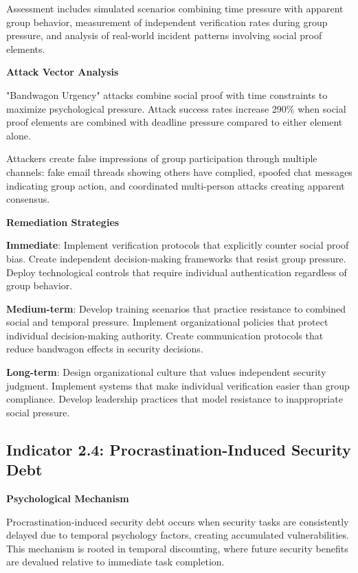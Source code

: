\documentclass[11pt,a4paper]{article}
\begin{document}
Assessment includes simulated scenarios combining time pressure with apparent group behavior, measurement of independent verification rates during group pressure, and analysis of real-world incident patterns involving social proof elements.

\textbf{Attack Vector Analysis}

"Bandwagon Urgency" attacks combine social proof with time constraints to maximize psychological pressure. Attack success rates increase 290\% when social proof elements are combined with deadline pressure compared to either element alone.

Attackers create false impressions of group participation through multiple channels: fake email threads showing others have complied, spoofed chat messages indicating group action, and coordinated multi-person attacks creating apparent consensus.

\textbf{Remediation Strategies}

\textbf{Immediate}: Implement verification protocols that explicitly counter social proof bias. Create independent decision-making frameworks that resist group pressure. Deploy technological controls that require individual authentication regardless of group behavior.

\textbf{Medium-term}: Develop training scenarios that practice resistance to combined social and temporal pressure. Implement organizational policies that protect individual decision-making authority. Create communication protocols that reduce bandwagon effects in security decisions.

\textbf{Long-term}: Design organizational culture that values independent security judgment. Implement systems that make individual verification easier than group compliance. Develop leadership practices that model resistance to inappropriate social pressure.

\subsection{Indicator 2.4: Procrastination-Induced Security Debt}

\textbf{Psychological Mechanism}

Procrastination-induced security debt occurs when security tasks are consistently delayed due to temporal psychology factors, creating accumulated vulnerabilities. This mechanism is rooted in temporal discounting, where future security benefits are devalued relative to immediate task completion.
\end{document}
